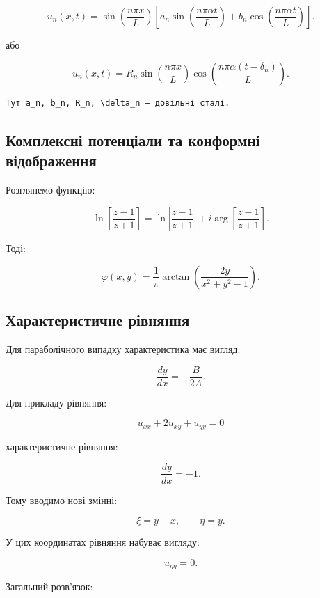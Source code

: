 \documentclass[
  ukrainian,
]{article}
\begin{document}
\[
u_n(x,t)=\sin\!\left(\frac{n\pi x}{L}\right)
\left[a_n \sin\!\left(\frac{n\pi \alpha t}{L}\right)
+ b_n \cos\!\left(\frac{n\pi \alpha t}{L}\right)\right].
\]

або

\[
u_n(x,t)=R_n \sin\!\left(\frac{n\pi x}{L}\right)
\cos\!\left(\frac{n\pi \alpha (t-\delta_n)}{L}\right).
\]

\begin{verbatim}
Тут a_n, b_n, R_n, \delta_n — довільні сталі.
\end{verbatim}

\subsection{Комплексні потенціали та конформні
відображення}\label{ux43aux43eux43cux43fux43bux435ux43aux441ux43dux456-ux43fux43eux442ux435ux43dux446ux456ux430ux43bux438-ux442ux430-ux43aux43eux43dux444ux43eux440ux43cux43dux456-ux432ux456ux434ux43eux431ux440ux430ux436ux435ux43dux43dux44f}

Розглянемо функцію:

\[
\ln\left[\frac{z-1}{z+1}\right]
= \ln\left|\frac{z-1}{z+1}\right|
+ i \arg\left[\frac{z-1}{z+1}\right].
\]

Тоді:

\[
\varphi(x,y)=\frac{1}{\pi}\arctan\left(\frac{2y}{x^2+y^2-1}\right).
\]

\subsection{Характеристичне
рівняння}\label{ux445ux430ux440ux430ux43aux442ux435ux440ux438ux441ux442ux438ux447ux43dux435-ux440ux456ux432ux43dux44fux43dux43dux44f}

Для параболічного випадку характеристика має вигляд:

\[
\frac{dy}{dx} = -\frac{B}{2A}.
\]

Для прикладу рівняння:

\[
u_{xx} + 2u_{xy} + u_{yy} = 0
\]

характеристичне рівняння:

\[
\frac{dy}{dx} = -1.
\]

Тому вводимо нові змінні:

\[
\xi = y - x, \qquad \eta = y.
\]

У цих координатах рівняння набуває вигляду:

\[
u_{\eta\eta} = 0.
\]

Загальний розв'язок:
\end{document}
